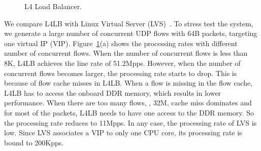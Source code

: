 \begin{figure}[t!]
	\centering
	


	\caption{L4 Load Balancer.}
	\label{clicknp:fig:l4}

\end{figure}


 We compare L4LB with Linux Virtual Server (LVS)~\cite{lvs}.
To stress test the system, we generate a large number of concurrent UDP flows with 64B packets, targeting one virtual IP (VIP).
Figure~\ref{clicknp:fig:l4}(a) shows the processing rates with different number of concurrent flows.
When the number of concurrent flows is less than 8K, L4LB achieves the line rate of 51.2Mpps.
However, when the number of concurrent flows becomes larger, the processing rate starts to drop.
This is because of flow cache misses in L4LB. 
When a flow is missing in the flow cache,  L4LB has to access the onboard DDR memory,
which results in lower performance.
When there are too many flows, \eg, 32M, cache miss dominates and for most of the packets, 
L4LB needs to have one access to the DDR memory. So the processing rate reduces to 11Mpps.
In any case, the processing rate of LVS is low.  
Since LVS associates a VIP to only one CPU core, its processing rate is bound to 200Kpps.

